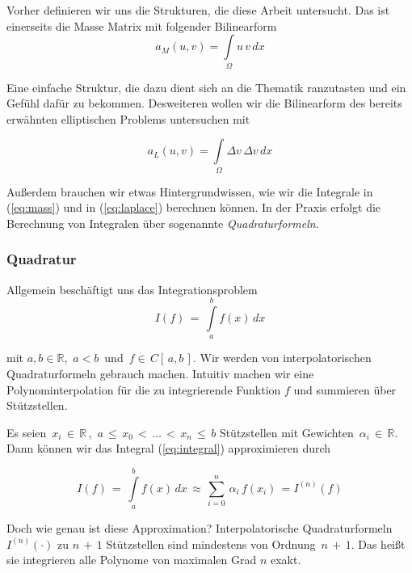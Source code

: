Vorher definieren wir uns die Strukturen, die diese Arbeit untersucht. Das ist einerseits die Masse Matrix mit folgender Bilinearform
\begin{equation} \label{eq:mass}
a_M(u,v)= \int\limits_{\Omega} u \, v \, dx
\end{equation}

Eine einfache Struktur, die dazu dient sich an die Thematik ranzutasten und ein Gefühl dafür zu bekommen. Desweiteren wollen wir die Bilinearform des bereits erwähnten elliptischen Problems untersuchen mit

\begin{equation} \label{eq:laplace}
a_L(u,v) = \int\limits_{\Omega} \Delta v \, \Delta v \, dx
\end{equation}

Außerdem brauchen wir etwas Hintergrundwissen, wie wir die Integrale in (\ref{eq:mass}) und in (\ref{eq:laplace}) berechnen können. In der Praxis erfolgt die Berechnung von Integralen über sogenannte \textit{Quadraturformeln}.

\subsubsection{Quadratur}

Allgemein beschäftigt uns das Integrationsproblem
\begin{equation} \label{eq:integral}
I(f) \, = \, \int\limits_{a}^{b} f(x) \, dx
\end{equation}

mit $a,b \in \mathbb{R}$, $\, a < b \, $ und $\, f \in \, C[ \, a,b \, ] $.
Wir werden von interpolatorischen Quadraturformeln gebrauch machen. Intuitiv machen wir eine Polynominterpolation für die zu integrierende Funktion $f$ und summieren über Stützstellen.

Es seien $\, x_i \, \in \, \mathbb{R} \,$, $\, a \, \leq \, x_0 \, < \, \dots \, < \, x_n \, \leq \, b$ Stützstellen mit Gewichten $\, \alpha_i \, \in \, \mathbb{R}$. Dann können wir das Integral (\ref{eq:integral}) approximieren durch

\begin{equation} \label{eq:integral}
I(f) \, = \, \int\limits_{a}^{b} f(x) \, dx \, \approx \, \sum\limits_{i=0}^{n} \, \alpha_i \, f(x_i) \, = I^{(n)}(f)
\end{equation}

Doch wie genau ist diese Approximation? Interpolatorische Quadraturformeln $I^{(n)}(\cdot)$ zu $n \, + \, 1$ Stützstellen sind mindestens von Ordnung $\, n \, + \,1$. Das heißt sie integrieren alle Polynome von maximalen Grad $n$ exakt.

